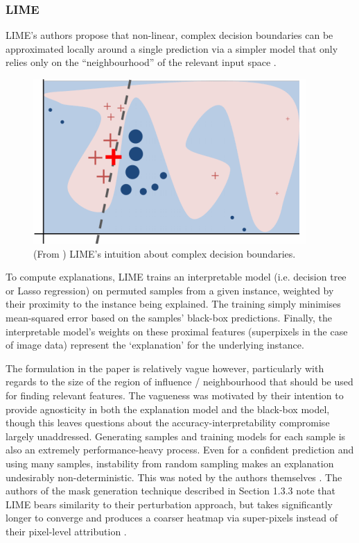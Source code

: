 \documentclass[main]{subfiles}
\begin{document}
\subsubsection{LIME}
LIME's authors propose that non-linear, complex decision boundaries can be approximated locally around a single prediction via a simpler model that only relies only on the ``neighbourhood'' of the relevant input space \cite{lime}. 

\begin{figure}[h]
\centering
\includegraphics[scale=0.65]{lime_figure.png}
\caption{(From \cite{lime}) LIME's intuition about complex decision boundaries.}
\label{limeimg}
\end{figure}

To compute explanations, LIME trains an interpretable model (i.e. decision tree or Lasso regression) on permuted samples from a given instance, weighted by their proximity to the instance being explained. The training simply minimises mean-squared error based on the samples' black-box predictions. Finally, the interpretable model's weights on these proximal features (superpixels in the case of image data) represent the `explanation' for the underlying instance. 

The formulation in the paper is relatively vague however, particularly with regards to the size of the region of influence / neighbourhood that should be used for finding relevant features. The vagueness was motivated by their intention to provide agnosticity in both the explanation model and the black-box model, though this leaves questions about the accuracy-interpretability compromise largely unaddressed. Generating samples and training models for each sample is also an extremely performance-heavy process. Even for a confident prediction and using many samples, instability from random sampling makes an explanation undesirably non-deterministic. This was noted by the authors themselves \cite{lime}. The authors of the mask generation technique described in Section 1.3.3 note that LIME bears similarity to their perturbation approach, but takes significantly longer to converge and produces a coarser heatmap via super-pixels instead of their pixel-level attribution \cite{perturb_fong}.
\end{document}
